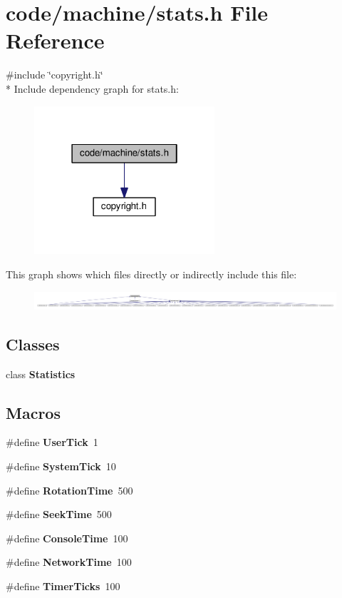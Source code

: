 \section{code/machine/stats.h File Reference}
\label{stats_8h}
{\ttfamily \#include \char`\"{}copyright.\+h\char`\"{}}\\*
Include dependency graph for stats.\+h\+:
\nopagebreak
\begin{figure}[H]
\begin{center}
\leavevmode
\includegraphics[width=190pt]{stats_8h__incl}
\end{center}
\end{figure}
This graph shows which files directly or indirectly include this file\+:
\nopagebreak
\begin{figure}[H]
\begin{center}
\leavevmode
\includegraphics[width=350pt]{stats_8h__dep__incl}
\end{center}
\end{figure}
\subsection*{Classes}
\begin{DoxyCompactItemize}
\item 
class {\bf Statistics}
\end{DoxyCompactItemize}
\subsection*{Macros}
\begin{DoxyCompactItemize}
\item 
\#define {\bf User\+Tick}~1
\item 
\#define {\bf System\+Tick}~10
\item 
\#define {\bf Rotation\+Time}~500
\item 
\#define {\bf Seek\+Time}~500
\item 
\#define {\bf Console\+Time}~100
\item 
\#define {\bf Network\+Time}~100
\item 
\#define {\bf Timer\+Ticks}~100
\end{DoxyCompactItemize}


